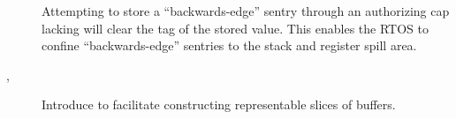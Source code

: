 \begin{description}
\begin{description}
    \item[] Attempting to store a ``backwards-edge'' sentry through an authorizing cap lacking \cappermSLC will clear the tag of the stored value.
    This enables the RTOS to confine ``backwards-edge'' sentries to the stack and register spill area.
    \item[,] Introduce  to facilitate constructing representable slices of buffers.
  \end{description}
\end{description}
